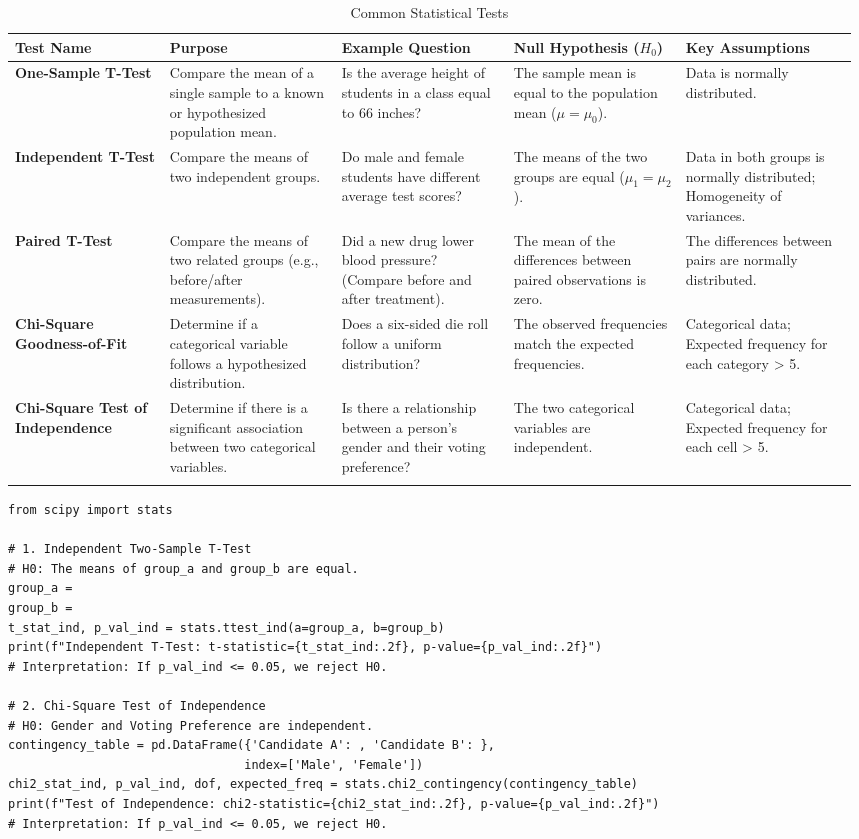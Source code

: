 \documentclass[11pt,a4paper]{article}
\begin{document}
\begin{longtable}{p{0.18\linewidth} p{0.2\linewidth} p{0.2\linewidth} p{0.2\linewidth} p{0.2\linewidth}}
\toprule
\textbf{Test Name} & \textbf{Purpose} & \textbf{Example Question} & \textbf{Null Hypothesis ($H_{0}$)} & \textbf{Key Assumptions} \\
\midrule
\endhead
\textbf{One-Sample T-Test} & Compare the mean of a single sample to a known or hypothesized population mean. & Is the average height of students in a class equal to 66 inches? & The sample mean is equal to the population mean ($\mu = \mu_{0}$). & Data is normally distributed. \\
\midrule
\textbf{Independent T-Test} & Compare the means of two independent groups. & Do male and female students have different average test scores? & The means of the two groups are equal ($\mu_{1} = \mu_{2}$). & Data in both groups is normally distributed; Homogeneity of variances. \\
\midrule
\textbf{Paired T-Test} & Compare the means of two related groups (e.g., before/after measurements). & Did a new drug lower blood pressure? (Compare before and after treatment). & The mean of the differences between paired observations is zero. & The differences between pairs are normally distributed. \\
\midrule
\textbf{Chi-Square Goodness-of-Fit} & Determine if a categorical variable follows a hypothesized distribution. & Does a six-sided die roll follow a uniform distribution? & The observed frequencies match the expected frequencies. & Categorical data; Expected frequency for each category > 5. \\
\midrule
\textbf{Chi-Square Test of Independence} & Determine if there is a significant association between two categorical variables. & Is there a relationship between a person's gender and their voting preference? & The two categorical variables are independent. & Categorical data; Expected frequency for each cell > 5. \\
\bottomrule
\caption{Common Statistical Tests}
\end{longtable}

\begin{lstlisting}
from scipy import stats

# 1. Independent Two-Sample T-Test
# H0: The means of group_a and group_b are equal.
group_a = 
group_b = 
t_stat_ind, p_val_ind = stats.ttest_ind(a=group_a, b=group_b)
print(f"Independent T-Test: t-statistic={t_stat_ind:.2f}, p-value={p_val_ind:.2f}")
# Interpretation: If p_val_ind <= 0.05, we reject H0.

# 2. Chi-Square Test of Independence
# H0: Gender and Voting Preference are independent.
contingency_table = pd.DataFrame({'Candidate A': , 'Candidate B': },
                                 index=['Male', 'Female'])
chi2_stat_ind, p_val_ind, dof, expected_freq = stats.chi2_contingency(contingency_table)
print(f"Test of Independence: chi2-statistic={chi2_stat_ind:.2f}, p-value={p_val_ind:.2f}")
# Interpretation: If p_val_ind <= 0.05, we reject H0.
\end{lstlisting}
\end{document}
